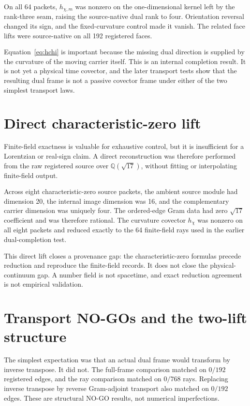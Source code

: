 \documentclass[12pt,a4paper,twoside]{article}
\newcommand{\Qsqrt}{\mathbb{Q}(\sqrt{17})}
\begin{document}
On all 64 packets, $h_{\chi,m}$ was nonzero on the one-dimensional kernel left by the rank-three seam, raising the source-native dual rank to four. Orientation reversal changed its sign, and the fixed-curvature control made it vanish. The related face lifts were source-native on all 192 registered faces.

Equation~\eqref{eq:hchi} is important because the missing dual direction is supplied by the curvature of the moving carrier itself. This is an internal completion result. It is not yet a physical time covector, and the later transport tests show that the resulting dual frame is not a passive covector frame under either of the two simplest transport laws.

\section{Direct characteristic-zero lift}

Finite-field exactness is valuable for exhaustive control, but it is insufficient for a Lorentzian or real-sign claim. A direct reconstruction was therefore performed from the raw registered source over $\Qsqrt$, without fitting or interpolating finite-field output.

Across eight characteristic-zero source packets, the ambient source module had dimension 20, the internal image dimension was 16, and the complementary carrier dimension was uniquely four. The ordered-edge Gram data had zero $\sqrt{17}$ coefficient and was therefore rational. The curvature covector $h_\chi$ was nonzero on all eight packets and reduced exactly to the 64 finite-field rays used in the earlier dual-completion test.

This direct lift closes a provenance gap: the characteristic-zero formulas precede reduction and reproduce the finite-field records. It does not close the physical-continuum gap. A number field is not spacetime, and exact reduction agreement is not empirical validation.

\section{Transport NO-GOs and the two-lift structure}

The simplest expectation was that an actual dual frame would transform by inverse transpose. It did not. The full-frame comparison matched on $0/192$ registered edges, and the ray comparison matched on $0/768$ rays. Replacing inverse transpose by reverse Gram-adjoint transport also matched on $0/192$ edges. These are structural NO-GO results, not numerical imperfections.
\end{document}
